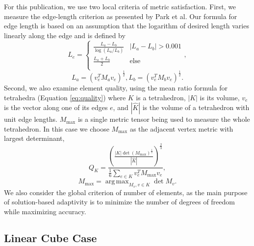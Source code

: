 \documentclass[3p,times,procedia,number]{elsarticle}
\DeclareMathOperator*{\argmax}{arg\,max}
\begin{document}
For this publication, we use two local criteria of metric satisfaction.
First, we measure the edge-length criterion as presented
by Park et al.\cite{park-loseille-krakos-michal-adapt-decomposition}
Our formula for edge length is based on an assumption
that the logarithm of desired length varies linearly along the
edge\cite{alauzet-fead-2010-size-gradation-aniso} and is defined
by
\begin{equation}
\label{eq:length}
L_e = \begin{cases}
\frac{L_a - L_b}{\log(L_a / L_b)} & |L_a - L_b| > 0.001 \\
\frac{L_a + L_b}{2} & \text{else} \\
\end{cases}
,
\end{equation}
\begin{equation}
\label{eq:endpoint_lengths}
L_a = (v_e^T M_a v_e)^{\frac12},
L_b = (v_e^T M_b v_e)^{\frac12}
.
\end{equation}
Second, we also examine element quality, using the
mean ratio formula for tetrahedra (Equation \ref{eq:quality})
where $K$ is a tetrahedron, $|K|$ is its volume,
$v_e$ is the vector along one of its edges $e$,
and $|\hat{K}|$ is the volume of a tetrahedron
with unit edge lengths.
$M_{\text{max}}$ is a single metric tensor
being used to measure the whole tetrahedron.
In this case we choose $M_{\text{max}}$ as the
adjacent vertex metric with largest determinant,
\begin{equation}
\label{eq:quality}
Q_K =
 \frac{\left(\frac{|K|\det(M_{\text{max}})^{\frac12}}
                  {|\hat{K}|}
       \right)^{\frac{2}{3}}}
      {\frac16\sum_{e\in K}{v_e^T M_{\text{max}} v_e}}
      ,
\end{equation}
\begin{equation}
\label{eq:max_metric}
M_{\text{max}} = \argmax_{M_v, v\in K}{\det{M_v}}
.
\end{equation}
We also consider the global criterion of number of elements,
as the main purpose of solution-based adaptivity is to
minimize the number of degrees of freedom while maximizing
accuracy.

\subsection{Linear Cube Case}
\end{document}
